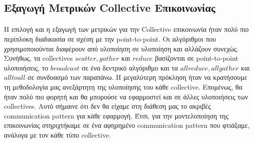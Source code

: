\subsection{Εξαγωγή Μετρικών Collective Επικοινωνίας}
\paragraph{}
Η επιλογή και η εξαγωγή των μετρικών για την Collective επικοινωνία ήταν πολύ πιο περίπλοκη διαδικασία σε σχέση με την point-to-point. Οι αλγόριθμοι που χρησιμοποιούνται διαφέρουν από υλοποίηση σε υλοποίηση και αλλάζουν συνεχώς. Συνήθως, τα collectives $scatter,gather$ και $reduce$ βασίζονται σε point-to-point υλοποιήσεις, το $broadcast$ σε ένα δεντρικό αλγόριθμο και τα $allreduce,allgather$ και $alltoall$ σε συνδυασμό των παραπάνω. Η μεγαλύτερη πρόκληση ήταν να κρατήσουμε τη μεθοδολογία μας ανεξάρτητη της υλοποίησης του κάθε collective. Επομένως, θα ήταν πολύ πιο φορητή και θα μπορούσε να εφαρμοστεί και σε άλλες υλοποιήσεις των collectives. Αυτό σήμαινε ότι δεν θα είχαμε στη διάθεση μας το ακριβές communication pattern για κάθε εφαρμογή. Έτσι, για την μοντελοποίηση της επικοινωνίας στηριχτήκαμε σε ένα αφηρημένο communication pattern που φτιάξαμε, ανάλογα με τον κάθε τύπο collective.
